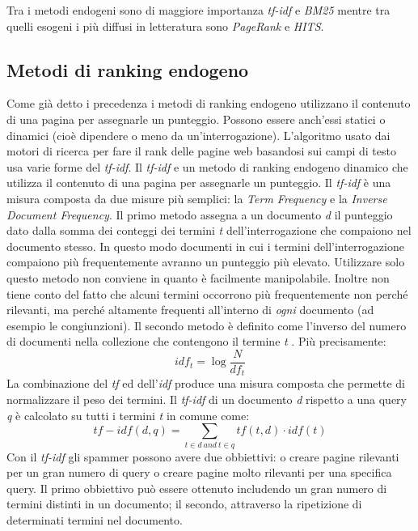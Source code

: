 Tra i metodi endogeni sono di maggiore importanza \textit{tf-idf} e \textit{BM25} mentre tra quelli esogeni i più diffusi in letteratura sono \textit{PageRank} e \textit{HITS}.

\subsection{Metodi di ranking endogeno}
Come già detto i precedenza i metodi di ranking endogeno utilizzano il contenuto di una pagina per assegnarle un punteggio. Possono essere anch’essi statici o dinamici (cioè dipendere o meno da un’interrogazione). L'algoritmo usato dai motori di ricerca per fare il rank delle pagine web basandosi sui campi di testo usa varie forme del \textit{tf-idf}. Il \textit{tf-idf} e un metodo di ranking endogeno dinamico che utilizza il contenuto di una pagina per assegnarle un punteggio. Il \textit{tf-idf} è una misura composta da due misure più semplici: la \textit{Term Frequency} e la \textit{Inverse Document Frequency}. Il primo metodo assegna a un documento \textit{d} il punteggio dato dalla somma dei conteggi dei termini \textit{t} dell'interrogazione che compaiono nel documento stesso. In questo modo documenti in cui i termini dell'interrogazione compaiono più frequentemente avranno un punteggio più elevato. Utilizzare solo questo metodo non conviene in quanto è facilmente manipolabile. Inoltre non tiene conto 
del fatto che alcuni termini occorrono più frequentemente non perché rilevanti, ma perché altamente frequenti all'interno di \textit{ogni} documento (ad esempio le congiunzioni). Il secondo metodo è definito come l'inverso del numero di documenti nella collezione che contengono il termine \textit{t} \cite{Manning:2008:IIR:1394399p117}. Più precisamente:
\begin{equation}
 idf_t=\log\frac{N}{df_t}
 \label{eq:idf}
\end{equation}
La combinazione del \textit{tf} ed dell'\textit{idf} produce una misura composta che permette di normalizzare il peso dei termini. Il \textit{tf-idf} di un documento \textit{d} rispetto a una query \textit{q} è calcolato su tutti i termini \textit{t} in comune come:
\begin{equation}
 tf-idf(d,q)=\sum_{t \in d \: and \: t \in q} tf(t,d) \cdot idf(t)
\end{equation}
Con il \textit{tf-idf} gli spammer possono avere due obbiettivi: o creare pagine rilevanti per un gran numero di query o creare pagine molto rilevanti per una specifica query. Il primo obbiettivo può essere ottenuto includendo un gran numero di termini distinti in un documento; il secondo, attraverso la ripetizione di determinati termini nel documento.

